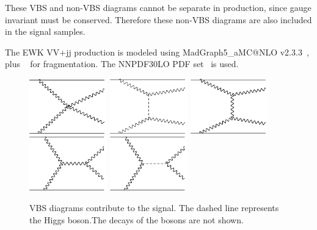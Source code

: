 These VBS and non-VBS diagrams cannot be separate in production, since gauge invariant must be conserved. Therefore these non-VBS diagrams are also included in the signal samples.

The EWK VV+jj production is modeled using MadGraph5\_aMC@NLO v2.3.3~\cite{Alwall:2014hca},
plus ~\cite{Sjostrand:2007gs} for fragmentation.
The \textsc{NNPDF30LO} PDF set~\cite{Ball:2012cx} is used.

\begin{figure}[tbp]
\begin{center}
 \includegraphics[width=0.3\textwidth,keepaspectratio]{figures/samples/feynVBS2.pdf}
 \includegraphics[width=0.3\textwidth,keepaspectratio]{figures/samples/feynVBS1.pdf}
 \includegraphics[width=0.3\textwidth,keepaspectratio]{figures/samples/feynVBS3.pdf}
 \includegraphics[width=0.3\textwidth,keepaspectratio]{figures/samples/feynVBS4.pdf}
 \includegraphics[width=0.3\textwidth,keepaspectratio]{figures/samples/feynVBS5.pdf}
\caption[f]{
VBS diagrams contribute to the signal.  
The dashed line represents the Higgs boson.The decays of the bosons are not shown.
}
\label{fig:feynmanVBS}
\end{center}
\end{figure}

